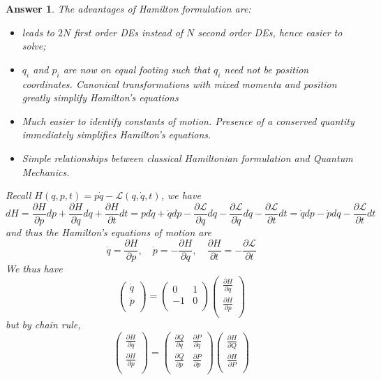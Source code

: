 \documentclass[a4paper]{article}
\newtheorem{ans}{Answer}[section]
\theoremstyle{new}
\begin{document}
\begin{ans}
The advantages of Hamilton formulation are:
\begin{itemize}
    \item leads to $2N$ first order DEs instead of $N$ second order DEs, hence easier to solve;
    \item $q_i$ and $p_i$ are now on equal footing such that $q_i$ need not be position coordinates. Canonical transformations with mixed momenta and position greatly simplify Hamilton's equations
    \item Much easier to identify constants of motion. Presence of a conserved quantity immediately simplifies Hamilton's equations.
    \item Simple relationships between classical Hamiltonian formulation and Quantum Mechanics. 
\end{itemize}
Recall $H(q,p,t)=p\dot{q}-\mathcal{L}(q,\dot{q},t)$, we have
$$dH=\frac{\partial H}{\partial p}dp+\frac{\partial H}{\partial q}dq+\frac{\partial H}{\partial t}dt=pd\dot{q}+\dot{q}dp-\frac{\partial\mathcal{L}}{\partial q}dq-\frac{\partial\mathcal{L}}{\partial\dot{q}}d\dot{q}-\frac{\partial\mathcal{L}}{\partial t}dt=\dot{q}dp-\dot{p}dq-\frac{\partial\mathcal{L}}{\partial t}dt$$
and thus the Hamilton's equations of motion are
$$\dot{q}=\frac{\partial H}{\partial p},\quad\dot{p}=-\frac{\partial H}{\partial q},\quad\frac{\partial H}{\partial t}=-\frac{\partial\mathcal{L}}{\partial t}$$
We thus have
$$\begin{pmatrix}\dot{q}\\\dot{p}\\\end{pmatrix}=\begin{pmatrix}0&1\\-1&0\\\end{pmatrix}\begin{pmatrix}\frac{\partial H}{\partial q}\\\frac{\partial H}{\partial p}\\\end{pmatrix}$$
but by chain rule,
$$\begin{pmatrix}\frac{\partial H}{\partial q}\\\frac{\partial H}{\partial p}\\\end{pmatrix}=\begin{pmatrix}\frac{\partial Q}{\partial q}&\frac{\partial P}{\partial q}\\\frac{\partial Q}{\partial p}&\frac{\partial P}{\partial p}\\\end{pmatrix}\begin{pmatrix}\frac{\partial H}{\partial Q}\\\frac{\partial H}{\partial P}\\\end{pmatrix}$$

\end{ans}
\end{document}
